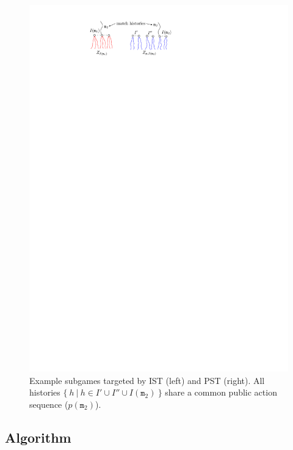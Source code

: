 \documentclass{aamas2015}
\newcommand{\ttm}{\mathtt{m}}
\begin{document}
\begin{figure}[t]
\begin{center}
\includegraphics[scale=1.1]{fig/targeting}
\end{center}
\caption{Example subgames targeted by IST (left) and PST (right). All histories $\{~h~|~h \in I' \cup I'' \cup I(\ttm_2)~\}$ 
share a common public action sequence ($p(\ttm_2)$). \label{fig:targeting}}
\end{figure}

\subsection{Algorithm}
\end{document}
